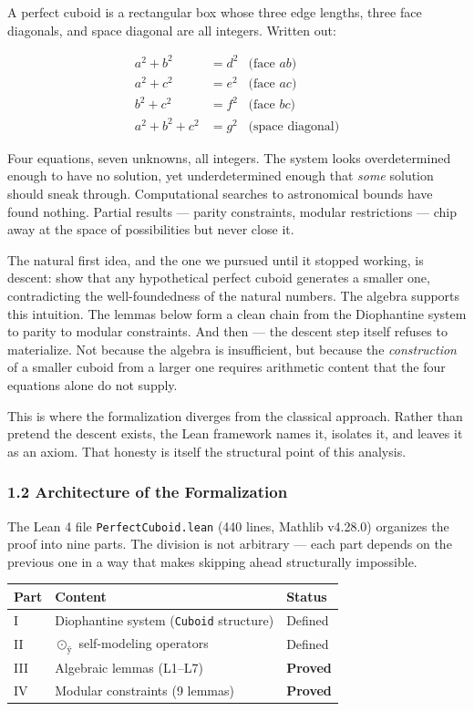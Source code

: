 A perfect cuboid is a rectangular box whose three edge lengths, three
face diagonals, and space diagonal are all integers. Written out:

\[\begin{aligned}
a^2 + b^2 &= d^2 & \text{(face } ab\text{)} \\
a^2 + c^2 &= e^2 & \text{(face } ac\text{)} \\
b^2 + c^2 &= f^2 & \text{(face } bc\text{)} \\
a^2 + b^2 + c^2 &= g^2 & \text{(space diagonal)}
\end{aligned}\]

Four equations, seven unknowns, all integers. The system looks
overdetermined enough to have no solution, yet underdetermined enough
that \emph{some} solution should sneak through. Computational searches
to astronomical bounds have found nothing. Partial results --- parity
constraints, modular restrictions --- chip away at the space of
possibilities but never close it.

The natural first idea, and the one we pursued until it stopped working,
is descent: show that any hypothetical perfect cuboid generates a
smaller one, contradicting the well-foundedness of the natural numbers.
The algebra supports this intuition. The lemmas below form a clean chain
from the Diophantine system to parity to modular constraints. And then
--- the descent step itself refuses to materialize. Not because the
algebra is insufficient, but because the \emph{construction} of a
smaller cuboid from a larger one requires arithmetic content that the
four equations alone do not supply.

This is where the formalization diverges from the classical approach.
Rather than pretend the descent exists, the Lean framework names it,
isolates it, and leaves it as an axiom. That honesty is itself the
structural point of this analysis.

\subsubsection{1.2 Architecture of the
Formalization}\label{architecture-of-the-formalization}

The Lean 4 file \texttt{PerfectCuboid.lean} (440 lines, Mathlib v4.28.0)
organizes the proof into nine parts. The division is not arbitrary ---
each part depends on the previous one in a way that makes skipping ahead
structurally impossible.

{\def\LTcaptype{none} %
\begin{longtable}[]{@{}lll@{}}
\toprule\noalign{}
Part & Content & Status \\
\midrule\noalign{}
\endhead
\bottomrule\noalign{}
\endlastfoot
I & Diophantine system (\texttt{Cuboid} structure) & Defined \\
II & \(\odot_{\text{ÿ}}\) self-modeling operators & Defined \\
III & Algebraic lemmas (L1--L7) & \textbf{Proved} \\
IV & Modular constraints (9 lemmas) & \textbf{Proved} \\
\end{longtable}
}

